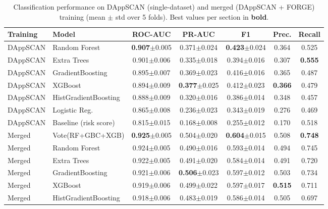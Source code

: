 \begin{table}[t]
\centering
\caption{Classification performance on DAppSCAN (single-dataset) and merged (DAppSCAN + FORGE) training (mean $\pm$ std over 5 folds). Best values per section in \textbf{bold}.}
\label{tab:model_comparison}
\setlength{\tabcolsep}{3pt}
\small
\begin{tabular}{ll ccccc}
\hline
\textbf{Training} & \textbf{Model} & \textbf{ROC-AUC} & \textbf{PR-AUC} & \textbf{F1} & \textbf{Prec.} & \textbf{Recall} \\
\hline
DAppSCAN & Random Forest & \textbf{0.907}$\pm$0.005 & 0.371$\pm$0.024 & \textbf{0.423}$\pm$0.024 & 0.364 & 0.525 \\
DAppSCAN & Extra Trees & 0.901$\pm$0.006 & 0.335$\pm$0.018 & 0.394$\pm$0.016 & 0.307 & \textbf{0.555} \\
DAppSCAN & GradientBoosting & 0.895$\pm$0.007 & 0.369$\pm$0.023 & 0.416$\pm$0.016 & 0.365 & 0.487 \\
DAppSCAN & XGBoost & 0.894$\pm$0.009 & \textbf{0.377}$\pm$0.025 & 0.412$\pm$0.023 & \textbf{0.366} & 0.479 \\
DAppSCAN & HistGradientBoosting & 0.888$\pm$0.009 & 0.320$\pm$0.016 & 0.386$\pm$0.014 & 0.348 & 0.457 \\
DAppSCAN & Logistic Reg. & 0.865$\pm$0.008 & 0.236$\pm$0.023 & 0.343$\pm$0.019 & 0.276 & 0.469 \\
DAppSCAN & Baseline (risk score) & 0.815$\pm$0.015 & 0.168$\pm$0.008 & 0.255$\pm$0.012 & 0.170 & 0.518 \\
\hline
Merged & Vote(RF+GBC+XGB) & \textbf{0.925}$\pm$0.005 & 0.504$\pm$0.020 & \textbf{0.604}$\pm$0.015 & 0.508 & \textbf{0.748} \\
Merged & Random Forest & 0.924$\pm$0.005 & 0.490$\pm$0.016 & 0.593$\pm$0.014 & 0.494 & 0.745 \\
Merged & Extra Trees & 0.922$\pm$0.005 & 0.491$\pm$0.020 & 0.584$\pm$0.014 & 0.491 & 0.720 \\
Merged & GradientBoosting & 0.921$\pm$0.006 & \textbf{0.506}$\pm$0.023 & 0.597$\pm$0.012 & 0.503 & 0.734 \\
Merged & XGBoost & 0.919$\pm$0.006 & 0.499$\pm$0.022 & 0.597$\pm$0.017 & \textbf{0.515} & 0.711 \\
Merged & HistGradientBoosting & 0.918$\pm$0.006 & 0.483$\pm$0.019 & 0.586$\pm$0.014 & 0.505 & 0.697 \\
\hline
\end{tabular}
\end{table}

